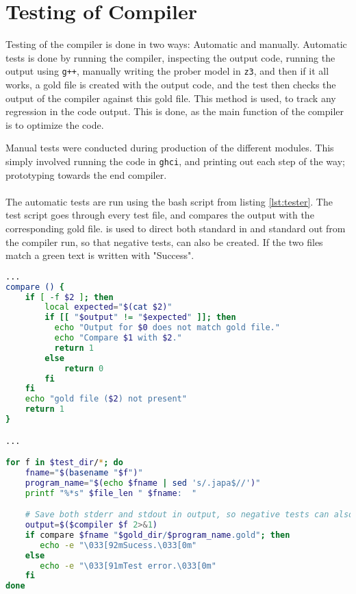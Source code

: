 \section{Testing of Compiler \ms}
Testing of the compiler is done in two ways: Automatic and manually. Automatic tests is
done by running the compiler, inspecting the output code, running the output using \texttt{g++},
manually writing the prober model in \texttt{z3}, and then if it all works, a gold file is
created with the output code, and the test then checks the output of the compiler against this
gold file. This method is used, to track any regression in the code output. This is done, as
the main function of the compiler is to optimize the code.

Manual tests were conducted during production of the different modules. This simply involved
running the code in \texttt{ghci}, and printing out each step of the way; prototyping towards
the end compiler.
\\
\\
The automatic tests are run using the bash script from listing \ref{lst:tester}. The test
script goes through every test \lan file, and compares the output with the corresponding
gold file.  is used to direct both standard in and standard out from the compiler
run, so that negative tests, can also be created. If the two files match a green text
is written with "Success".


\begin{lstlisting}[language=Bash, label={lst:tester}]
...
compare () {
    if [ -f $2 ]; then
        local expected="$(cat $2)"
        if [[ "$output" != "$expected" ]]; then
          echo "Output for $0 does not match gold file."
          echo "Compare $1 with $2."
          return 1
        else
            return 0
        fi
    fi
    echo "gold file ($2) not present"
    return 1
}

...

for f in $test_dir/*; do
    fname="$(basename "$f")"
    program_name="$(echo $fname | sed 's/.japa$//')"
    printf "%*s" $file_len " $fname:  "

    # Save both stderr and stdout in output, so negative tests can also be tested
    output=$($compiler $f 2>&1)
    if compare $fname "$gold_dir/$program_name.gold"; then
       echo -e "\033[92mSucess.\033[0m"
    else
       echo -e "\033[91mTest error.\033[0m"
    fi
done
\end{lstlisting}